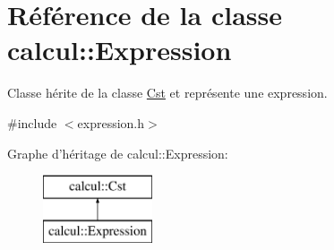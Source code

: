 \hypertarget{classcalcul_1_1_expression}{\section{Référence de la classe calcul\-:\-:Expression}
\label{classcalcul_1_1_expression}
}


Classe hérite de la classe \hyperlink{classcalcul_1_1_cst}{Cst} et représente une expression.  




{\ttfamily \#include $<$expression.\-h$>$}

Graphe d'héritage de calcul\-:\-:Expression\-:\begin{figure}[H]
\begin{center}
\leavevmode
\includegraphics[height=2.000000cm]{classcalcul_1_1_expression}
\end{center}
\end{figure}
